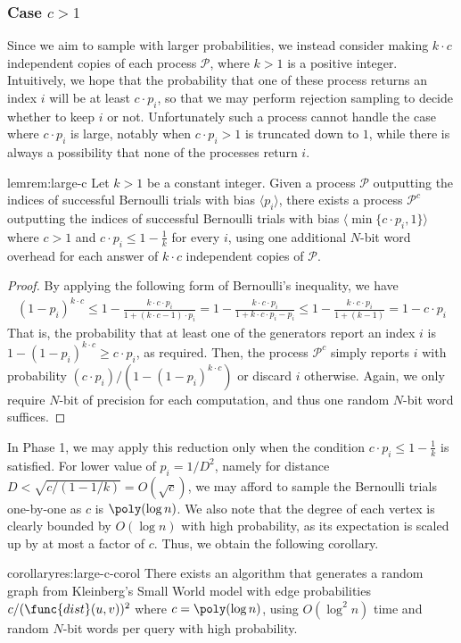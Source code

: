 \subsubsection{Case $c > 1$}

Since we aim to sample with larger probabilities, we instead consider making $k\cdot c$ independent copies of each process $\mathcal{P}$, where $k>1$ is a positive integer.
Intuitively, we hope that the probability that one of these process returns an index $i$ will be at least $c\cdot p_i$, so that we may perform rejection sampling to decide whether to keep $i$ or not.
Unfortunately such a process cannot handle the case where $c\cdot p_i$ is large, notably when $c\cdot p_i > 1$ is truncated down to $1$, while there is always a possibility that none of the processes return $i$.

\begin{restatable}{lem}{rem:large-c}
Let $k>1$ be a constant integer. Given a process $\mathcal{P}$ outputting the indices of successful Bernoulli trials with bias $\langle p_i\rangle$, there exists a process $\mathcal{P}^c$ outputting the indices of successful Bernoulli trials with bias $\langle \min\{c\cdot p_i, 1\}\rangle$ where $c>1$ and $c \cdot p_i \leq 1-\frac{1}{k}$ for every $i$,
using one additional $N$-bit word overhead for each answer of $k\cdot c$ independent copies of $\mathcal{P}$.
\end{restatable}
\begin{proof}
By applying the following form of Bernoulli's inequality, we have
\begin{align*}
(1-p_{i})^{k\cdot c} \leq 1-\frac{k\cdot c\cdot p_{i}}{1+(k\cdot c-1)\cdot p_{i}}
= 1-\frac{k\cdot c\cdot p_{i}}{1+k\cdot c\cdot p_{i}-p_{i}}
\leq 1-\frac{k\cdot c\cdot p_{i}}{1+(k-1)} = 1-c\cdot p_{i}
\end{align*}
That is, the probability that at least one of the generators report an index $i$ is $1-(1-p_{i})^{k\cdot c} \geq c\cdot p_i$, as required.
Then, the process $\mathcal{P}^c$ simply reports $i$ with probability $(c\cdot p_i) / (1-(1-p_{i})^{k\cdot c})$ or discard $i$ otherwise.
Again, we only require $N$-bit of precision for each computation, and thus one random $N$-bit word suffices.
\end{proof}

In Phase 1, we may apply this reduction only when the condition $c \cdot p_i \leq 1-\frac{1}{k}$ is satisfied.
For lower value of $p_i = 1/D^2$, namely for distance $D < \sqrt{c/(1-1/k)} = O(\sqrt{c})$, we may afford to sample the Bernoulli trials one-by-one as $c$ is $\poly(\log n)$.
We also note that the degree of each vertex is clearly bounded by $O(\log n)$ with high probability, as its expectation is scaled up by at most a factor of $c$.
Thus, we obtain the following corollary.
\begin{restatable}{corollary}{res:large-c-corol}
There exists an algorithm that generates a random graph from Kleinberg's Small World model with edge probabilities $c/(\func{dist}(u,v))^2$ where $c = \poly(\log n)$,
using $O(\log^2 n)$ time and random $N$-bit words per  query with high probability.
\end{restatable}

